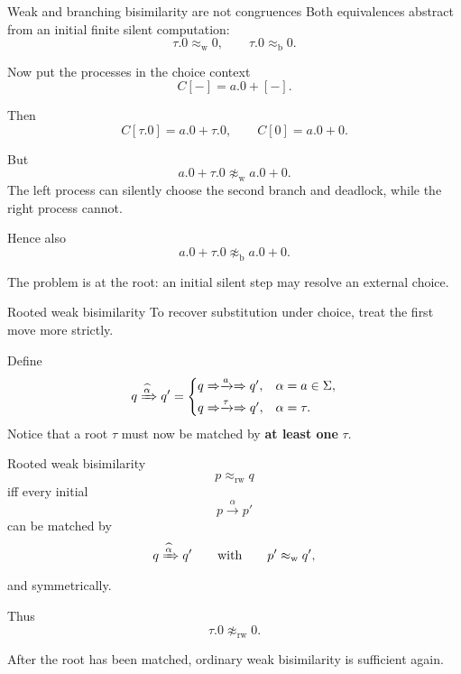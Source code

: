 \documentclass[handout,aspectratio=169,11pt]{beamer}
\newcommand{\step}[1]{\xrightarrow{#1}}
\newcommand{\Takeaway}[1]{\begin{exampleblock}{}#1\end{exampleblock}}
\begin{document}
\begin{frame}{Weak and branching bisimilarity are not congruences}
  Both equivalences abstract from an initial finite silent computation:
  \[
       \tau.0\approx_{\mathrm w}0,
       \qquad
       \tau.0\approx_{\mathrm b}0.
  \]

  Now put the processes in the choice context
  \[
       C[-]=a.0+[-].
  \]

  Then
  \[
      C[\tau.0]=a.0+\tau.0,
      \qquad
      C[0]=a.0+0.
  \]

  But
  \[
      a.0+\tau.0\not\approx_{\mathrm w}a.0+0.
  \]
  The left process can silently choose the second branch and deadlock,
  while the right process cannot.

  Hence also
  \[
      a.0+\tau.0\not\approx_{\mathrm b}a.0+0.
  \]

  \Takeaway{The problem is at the root:
  an initial silent step may resolve an external choice.}
\end{frame}


\begin{frame}{Rooted weak bisimilarity}
  To recover substitution under choice, treat the first move more strictly.

  Define
  \[
  q\xRightarrow{\widehat{\alpha}}q'=
  \begin{cases}
    q\Rightarrow\step{a}\Rightarrow q',
       & \alpha=a\in\Sigma,\\[1mm]
    q\Rightarrow\step{\tau}\Rightarrow q',
       & \alpha=\tau.
  \end{cases}
  \]
  Notice that a root $\tau$ must now be matched by
  \textbf{at least one} $\tau$.

  \begin{block}{Rooted weak bisimilarity}
    \[
      p\approx_{\mathrm{rw}}q
    \]
    iff every initial
    \[
      p\step{\alpha}p'
    \]
    can be matched by
    \[
      q\xRightarrow{\widehat{\alpha}}q'
      \qquad\text{with}\qquad
      p'\approx_{\mathrm w}q',
    \]
    and symmetrically.
  \end{block}

  Thus
  \[
     \tau.0\not\approx_{\mathrm{rw}}0.
  \]

  \Takeaway{After the root has been matched, ordinary weak
  bisimilarity is sufficient again.}
\end{frame}
\end{document}
